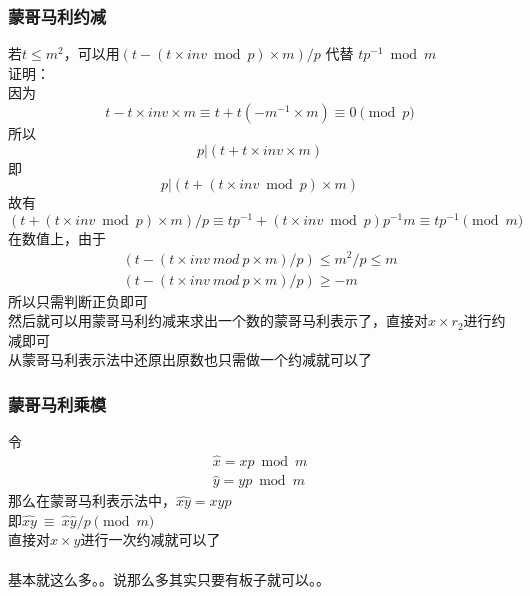 	\subsubsection{蒙哥马利约减}
	若$t\le m^2$，可以用$(t-(t\times inv \bmod p)\times m )/p$  代替  $tp^{-1} \bmod  m$\\
	证明：\\
	因为
	$$
	t-t\times inv\times m\equiv t+t(-m^{-1}\times m)\equiv0\pmod p
	$$
	所以
	$$
	p|(t+t\times inv\times m)
	$$
	即
	$$
	p|(t+(t\times inv\bmod p)\times m)
	$$
	故有
	$$
	(t+(t\times inv\bmod p)\times m )/p\equiv tp^{-1}+(t\times inv\bmod p)p^{-1}m\equiv tp^{-1}\pmod m
	$$
	在数值上，由于\\
	$$
	\begin{aligned}
	(t-(t\times inv\ mod \ p\times m)/p)\le m^2/p\le m\\
	(t-(t\times inv\ mod \ p\times m)/p)\ge -m
	\end{aligned}
	$$
	所以只需判断正负即可\\
	然后就可以用蒙哥马利约减来求出一个数的蒙哥马利表示了，直接对$x\times r_2$进行约减即可\\
	从蒙哥马利表示法中还原出原数也只需做一个约减就可以了\\
	\subsubsection{蒙哥马利乘模}
	令
	$$
	\begin{aligned}
	\hat{x}=xp \bmod m\\
	\hat{y}=yp \bmod m
	\end{aligned}
	$$
	那么在蒙哥马利表示法中，$\hat{xy}=xyp$\\
	即$\hat{xy} \ \equiv \ \hat{x}\hat{y}/p\pmod m$\\
	直接对$x\times y$进行一次约减就可以了\\
	\vspace{1.7cm}~\\
	基本就这么多。。说那么多其实只要有板子就可以。。
	
%	
	\newpage
